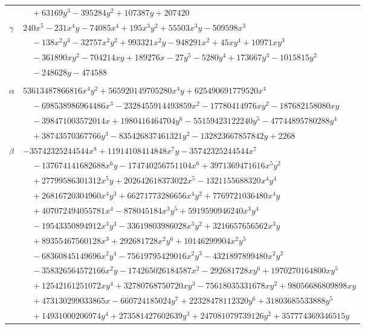 \documentclass[11pt]{article}
\begin{document}
\begin{longtable}{@{}ll@{}}
 & $\quad +63169y^{3}-395284y^{2}+107387y+207420$\\
$\gamma$ & $240x^{5}-231x^{4}y-74085x^{4}+195x^{3}y^{2}+55503x^{3}y-509598x^{3}$\\
 & $\quad -138x^{2}y^{3}-32757x^{2}y^{2}+993321x^{2}y-948291x^{2}+45xy^{4}+10971xy^{3}$\\
 & $\quad -361890xy^{2}-704214xy+189276x-27y^{5}-5280y^{4}+173667y^{3}-1015815y^{2}$\\
 & $\quad -248628y-474588$\\
\addlinespace[3pt]
\multicolumn{2}{@{}l}{$\{i,j\}=\{18,150\}$, $k_{ij}=2^{2}\cdot 3^{5}\cdot 7$}\\
$\alpha$ & $53613487866816x^{4}y^{2}+565920149705280x^{4}y+625490691779520x^{4}$\\
 & $\quad -698538986964486x^{3}-2328455914493859x^{2}-17780414976xy^{2}-187682158080xy$\\
 & $\quad -398471003572014x+1980416464704y^{6}-55159423122240y^{5}-47744895780288y^{4}$\\
 & $\quad +38743570367766y^{3}-835426837461321y^{2}-132823667857842y+2268$\\
$\beta$ & $-35742325244544x^{8}+11914108414848x^{7}y-35742325244544x^{7}$\\
 & $\quad -137674141682688x^{6}y-174740256751104x^{6}+3971369471616x^{5}y^{2}$\\
 & $\quad +27799586301312x^{5}y+202642618373022x^{5}-1321155688320x^{4}y^{4}$\\
 & $\quad +26816720304960x^{4}y^{3}+66271773286656x^{4}y^{2}+7769721036480x^{4}y$\\
 & $\quad +407072494055781x^{4}-878045184x^{3}y^{5}+5919590946240x^{3}y^{4}$\\
 & $\quad -19543350894912x^{3}y^{3}-33619803986028x^{3}y^{2}+3216657656562x^{3}y$\\
 & $\quad +89355467560128x^{3}+292681728x^{2}y^{6}+10146299904x^{2}y^{5}$\\
 & $\quad -68360845149696x^{2}y^{4}-75619795429016x^{2}y^{3}-4321897899480x^{2}y^{2}$\\
 & $\quad -358326564572166x^{2}y-174265026184587x^{2}-292681728xy^{6}+1970270164800xy^{5}$\\
 & $\quad +12542161251072xy^{4}+32780768750720xy^{3}-75618035331678xy^{2}+98056686809898xy$\\
 & $\quad +473130299033865x-660724185024y^{7}+22328478112320y^{6}+31803685533888y^{5}$\\
 & $\quad +14931000206974y^{4}+273581427602639y^{3}+247081079739126y^{2}+357774369346515y$\\

\end{longtable}
\end{document}
